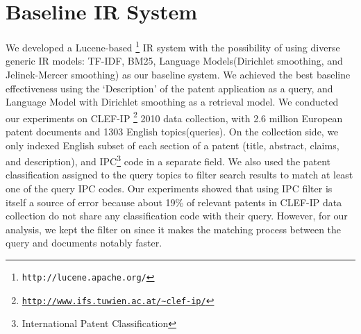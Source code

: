 \documentclass{sig-alternate}
\begin{document}
\section{Baseline IR System}
We developed a Lucene-based%
\footnote{\texttt{http://lucene.apache.org/}%
} IR system with the possibility of using diverse generic IR models: TF-IDF, BM25, Language Models(Dirichlet smoothing, and Jelinek-Mercer smoothing) as our baseline system. We achieved the best baseline effectiveness using the `Description' of the patent application as a query\cite{xue2009transforming}, and Language Model with Dirichlet smoothing as a retrieval model. We conducted our experiments on CLEF-IP%
\footnote{\texttt{\url{http://www.ifs.tuwien.ac.at/~clef-ip/}}}%
 2010 data collection, with 2.6 million European patent documents and 1303 English topics(queries). On the collection side, we only indexed English subset of each section of a patent (title, abstract, claims, and description), and IPC\footnote{International Patent Classification}%
  code in a separate field\cite{magdy2012toward}. We also used the patent classification assigned to the query topics to filter search results to match at least one of the query IPC codes\cite{lopez2010patatras}. Our experiments showed that using IPC filter is itself a source of error because about 19\% of relevant patents in CLEF-IP data collection do not share any classification code with their query. However, for our analysis, we kept the filter on since it makes the matching process between the query and documents notably faster.
\end{document}
